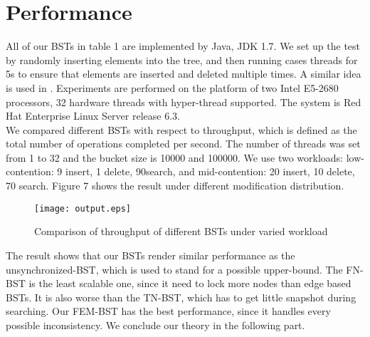 \documentclass{article}
\begin{document}
\section{Performance}
All of our BSTs in table 1 are implemented by Java, JDK 1.7. We set up the test by randomly inserting  elements into the tree, and then running cases threads for 5s to ensure that elements are inserted and deleted multiple times. A similar idea is used in \cite{alistarh2014spraylist}. 
Experiments are performed on the platform of two Intel E5-2680 processors, 32 hardware threads with hyper-thread supported. The system is Red Hat Enterprise Linux Server release 6.3.\\
We compared different BSTs with respect to throughput, which is defined as the total number of operations completed per second. The number of threads was set from 1 to 32 and the bucket size is 10000 and 100000. We use two workloads: low-contention: 9 insert, 1 delete, 90search, and mid-contention: 20 insert, 10 delete, 70 search.  Figure 7 shows the result under different modification distribution.
\begin{figure}[htbp]
\texttt{[image: output.eps]}
\caption{Comparison of throughput of different BSTs under varied workload}
\label{fig:my_label}
\end{figure}
The result shows that our BSTs render similar performance as the unsynchronized-BST, which is used to stand for a possible upper-bound. The FN-BST is the least scalable one, since it need to lock more nodes than edge based BSTs. It is also worse than the TN-BST, which has to get little snapshot during searching. Our FEM-BST has the best performance, since it handles every possible inconsistency. We conclude our theory in the following part. 
\end{document}
